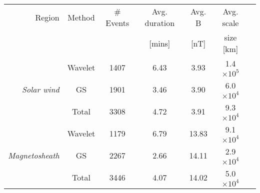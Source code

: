 \begin{tabular}{rcccccc}
\hline
Region                    &  Method &  \# Events &  Avg. duration &  Avg. B &  Avg. scale \\
 &    &   &  [mins] &  [nT] &  size [km] \\
\hline
         	         & Wavelet & 1407 & 6.43 & 3.93  & 1.4$\times 10^5$ \\
\textit{Solar wind} 	  & GS 	    & 1901 & 3.46 & 3.90  & 6.0$\times 10^4$ \\
         	           & Total   & 3308 & 4.72 & 3.91  & 9.3$\times 10^4$ \\
\hline
         	         & Wavelet & 1179 & 6.79 & 13.83 & 9.1$\times 10^4$ \\
\textit{Magnetosheath}    & GS      & 2267 & 2.66 & 14.11 & 2.9$\times 10^4$\\
         	         & Total   & 3446 & 4.07 & 14.02 & 5.0$\times 10^4$ \\
\hline
\end{tabular}
